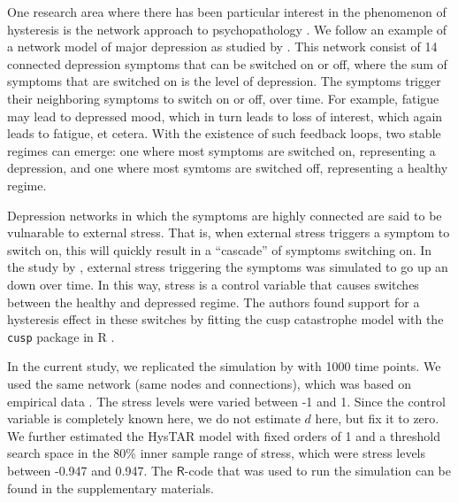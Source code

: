 \documentclass{article}
\begin{document}
One research area where there has been particular interest in the phenomenon of hysteresis is the network approach to psychopathology \citep{borsboom_psychometric_2008}.
We follow an example of a network model of major depression as studied by \citet{cramer_major_2016}.
This network consist of 14 connected depression symptoms that can be switched on or off, where the sum of symptoms that are switched on is the level of depression.
The symptoms trigger their neighboring symptoms to switch on or off, over time. For example, fatigue may lead to depressed mood, which in turn leads to loss of interest, which again leads to fatigue, et cetera.
With the existence of such feedback loops, two stable regimes can emerge: one where most symptoms are switched on, representing a depression, and one where most symtoms are switched off, representing a healthy regime.

Depression networks in which the symptoms are highly connected are said to be vulnarable to external stress.
That is, when external stress triggers a symptom to switch on, this will  quickly result in a ``cascade'' of symptoms switching on.
In the study by \citet{cramer_major_2016}, external stress triggering the symptoms was simulated to go up an down over time.
In this way, stress is a control variable that causes switches between the healthy and depressed regime.
The authors found support for a hysteresis effect in these switches by fitting the cusp catastrophe model with the \texttt{cusp} package in \textsf{R} \citep{R, R_cusp}.

In the current study, we replicated the simulation by \citet{cramer_major_2016} with 1000 time points. 
We used the same network (same nodes and connections), which was based on empirical data \citep{network_data}. 
The stress levels were varied between -1 and 1.
Since the control variable is completely known here, we do not estimate $d$ here, but fix it to zero.
We further estimated the HysTAR model with fixed orders of 1 and a threshold search space in the 80\% inner sample range of stress, which were stress levels between -0.947 and 0.947.
The $\mathsf{R}$-code that was used to run the simulation can be found in the supplementary materials.
\end{document}
